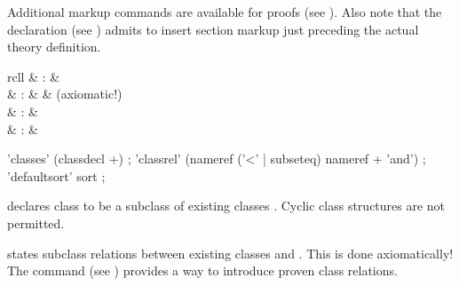 \begin{isabellebody}
\begin{isamarkuptext}
  \medskip Additional markup commands are available for proofs (see
  ).  Also note that the \hyperlink{command.header}{\mbox{}} declaration (see ) admits to insert
  section markup just preceding the actual theory definition.%
\end{isamarkuptext}%
\isamarkuptrue%
%
\isamarkuptrue%
%
\begin{isamarkuptext}%
\begin{matharray}{rcll}
    \hypertarget{command.classes}{\hyperlink{command.classes}{\mbox{}}} & : &  \\
    \hypertarget{command.classrel}{\hyperlink{command.classrel}{\mbox{}}} & : &  & (axiomatic!) \\
    \hypertarget{command.defaultsort}{\hyperlink{command.defaultsort}{\mbox{}}} & : &  \\
    \hypertarget{command.class-deps}{\hyperlink{command.class-deps}{\mbox{}}} & : &  \\
  \end{matharray}

  \begin{rail}
    'classes' (classdecl +)
    ;
    'classrel' (nameref ('<' | subseteq) nameref + 'and')
    ;
    'defaultsort' sort
    ;
  \end{rail}

  \begin{descr}

  \item [\hyperlink{command.classes}{\mbox{\isa{\isacommand{classes}}}}~\isa{{\isachardoublequote}c\ {\isasymsubseteq}\ c\isactrlsub {\isadigit{1}}{\isacharcomma}\ {\isasymdots}{\isacharcomma}\ c\isactrlsub n{\isachardoublequote}}]
  declares class  to be a subclass of existing classes .  Cyclic class structures are not permitted.

  \item [\hyperlink{command.classrel}{\mbox{\isa{\isacommand{classrel}}}}~\isa{{\isachardoublequote}c\isactrlsub {\isadigit{1}}\ {\isasymsubseteq}\ c\isactrlsub {\isadigit{2}}{\isachardoublequote}}] states
  subclass relations between existing classes  and
  .  This is done axiomatically!  The \hyperlink{command.instance}{\mbox{}} command (see ) provides a way to
  introduce proven class relations.


\end{descr}
\end{isamarkuptext}
\end{isabellebody}
